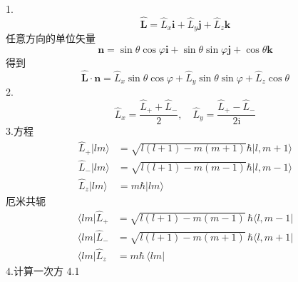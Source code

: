 1.
\begin{equation}
    \hat{\boldsymbol{L}}=\hat{L}_x\boldsymbol{i}+\hat{L}_y\boldsymbol{j}+\hat{L}_z\boldsymbol{k}
\end{equation}
任意方向的单位矢量
\begin{equation}
    \boldsymbol{n}=\sin \theta \cos \varphi \boldsymbol{i}+\sin \theta \sin \varphi \boldsymbol{j}+\cos \theta \boldsymbol{k}
\end{equation}
得到
\begin{equation}
    \hat{\boldsymbol{L}}\cdot \boldsymbol{n}=\hat{L}_x\sin \theta \cos \varphi +\hat{L}_y\sin \theta \sin \varphi +\hat{L}_z\cos \theta 
\end{equation}
2.
\begin{equation}
    \hat{L}_x=\frac{\hat{L}_++\hat{L}_-}{2},\quad \hat{L}_y=\frac{\hat{L}_+-\hat{L}_-}{2\mathrm{i}}
\end{equation}
3.方程
\begin{equation}
    \begin{aligned}
        \hat{L}_+|lm\rangle &=\sqrt{l\left( l+1 \right) -m\left( m+1 \right)}\hbar |l,m+1\rangle 
\\
\hat{L}_-|lm\rangle &=\sqrt{l\left( l+1 \right) -m\left( m-1 \right)}\hbar |l,m-1\rangle 
\\
\hat{L}_z|lm\rangle &=m\hbar |lm\rangle 
    \end{aligned}
\end{equation}
厄米共轭
\begin{equation}
    \begin{aligned}
        \langle lm|\hat{L}_+&=\sqrt{l\left( l+1 \right) -m\left( m-1 \right)}\,\hbar \langle l,m-1|
\\
\langle lm|\hat{L}_-&=\sqrt{l\left( l+1 \right) -m\left( m+1 \right)}\,\hbar \langle l,m+1|
\\
\langle lm|\hat{L}_z&=m\hbar \,\langle lm|
    \end{aligned}
\end{equation}
4.计算一次方
4.1
